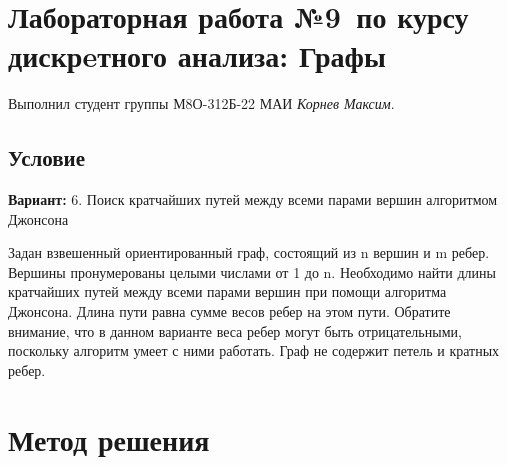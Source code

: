 \documentclass[12pt]{article}
\begin{document}
\section*{Лабораторная работа №9\, по курсу дискрeтного анализа: Графы}

Выполнил студент группы М8О-312Б-22 МАИ \textit{Корнев Максим}.

\subsection*{Условие}
\textbf{Вариант:} 6. Поиск кратчайших путей между всеми парами вершин алгоритмом Джонсона

Задан взвешенный ориентированный граф, состоящий из n вершин и m ребер. Вершины пронумерованы целыми числами от 1 до n. Необходимо найти длины кратчайших путей между всеми парами вершин при помощи алгоритма Джонсона. Длина пути равна сумме весов ребер на этом пути. Обратите внимание, что в данном варианте веса ребер могут быть отрицательными, поскольку алгоритм умеет с ними работать. Граф не содержит петель и кратных ребер.


\newpage
\section*{Метод решения}
\end{document}
